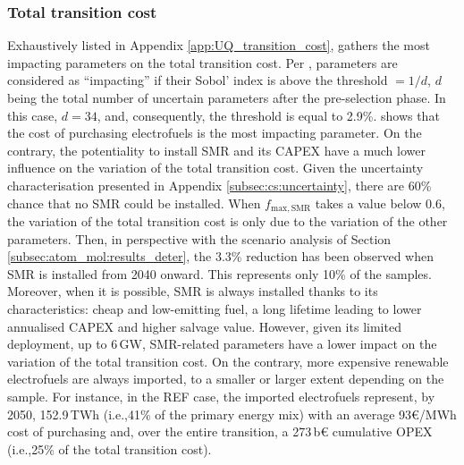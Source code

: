 \documentclass[11pt,twoside,a4paper,english]{article}
\def\ie{i.e.,}
\begin{document}
\subsubsection{Total transition cost}
\label{subsubsec:atom_mol:results_uq_cost}
Exhaustively listed in Appendix \ref{app:UQ_transition_cost},  gathers the most impacting parameters on the total transition cost. Per \citet{Turati2017}, parameters are considered as ``impacting'' if their Sobol' index is above the threshold $=1/d$, $d$ being the total number of uncertain parameters after the pre-selection phase. In this case, $d=34$, and, consequently, the threshold is equal to 2.9\%.  shows that the cost of purchasing electrofuels is the most impacting parameter. On the contrary, the potentiality to install \gls{SMR} and its CAPEX have a much lower influence on the variation of the total transition cost. Given the uncertainty characterisation presented in Appendix \ref{subsec:cs:uncertainty}, there are 60\% chance that no \gls{SMR} could be installed. When $f_{\mathrm{max,SMR}}$ takes a value below 0.6, the variation of the total transition cost is only due to the variation of the other parameters. Then, in perspective with the scenario analysis of Section \ref{subsec:atom_mol:results_deter}, the 3.3\% reduction has been observed when \gls{SMR} is installed from 2040 onward. This represents only 10\% of the samples. Moreover, when it is possible, \gls{SMR} is always installed thanks to its characteristics: cheap and low-emitting fuel, a long lifetime leading to lower annualised CAPEX and higher salvage value. However, given its limited deployment, up to 6\,GW, \gls{SMR}-related parameters have a lower impact on the variation of the total transition cost. On the contrary, more expensive renewable electrofuels are always imported, to a smaller or larger extent depending on the sample. For instance, in the REF case, the imported electrofuels represent, by 2050, 152.9\,TWh (\ie 41\% of the primary energy mix) with an average 93€/MWh cost of purchasing and, over the entire transition, a 273\,b€ cumulative OPEX (\ie 25\% of the total transition cost).
\end{document}
